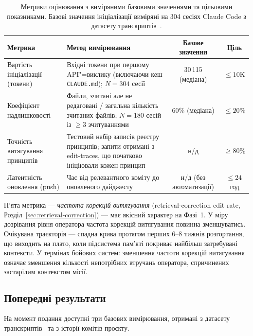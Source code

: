 \begin{table}[ht]
\centering
\small
\begin{tabularx}{\textwidth}{@{}l X c c@{}}
\toprule
\textbf{Метрика} & \textbf{Метод вимірювання} & \textbf{Базове значення} & \textbf{Ціль} \\
\midrule
Вартість ініціалізації (токени) &
  Вхідні токени при першому API"=виклику (включаючи кеш \texttt{CLAUDE.md}); $N{=}304$ сесії &
  30\,115 (медіана) & ${\leq}10$K \\
\addlinespace
Коефіцієнт надлишковості &
  Файли, зчитані але не редаговані / загальна кількість зчитаних файлів; $N{=}180$ сесій із ${\geq}3$ зчитуваннями &
  60\% (медіана) & ${\leq}20\%$ \\
\addlinespace
Точність витягування принципів &
  Тестовий набір записів реєстру принципів; запити отримані з edit-traces, що початково ініціювали кожен принцип &
  н/д & ${\geq}80\%$ \\
\addlinespace
Латентність оновлення (push) &
  Час від релевантного коміту до оновленого дайджесту &
  н/д (без автоматизації) & ${\leq}24$\,год \\
\bottomrule
\end{tabularx}
\caption{Метрики оцінювання з виміряними базовими значеннями та цільовими показниками.
  Базові значення ініціалізації виміряні на 304 сесіях Claude Code з датасету транскриптів~\citep{ovcharov2026edittrace}.}
\label{tab:metrics}
\end{table}

П'ята метрика --- \emph{частота корекцій витягування} (retrieval-correction edit rate, Розділ~\ref{sec:retrieval-correction}) --- має якісний характер на Фазі~1.
У міру дозрівання рівня оператора частота корекцій витягування повинна зменшуватись.
Очікувана траєкторія --- спадна крива протягом перших 6--8 тижнів розгортання, що виходить на плато, коли підсистема пам'яті покриває найбільш затребувані контексти.
У термінах бойових систем: зменшення частоти корекцій витягування означає зменшення кількості непотрібних втручань оператора, спричинених застарілим контекстом місії.


\subsection{Попередні результати}
\label{sec:preliminary}

На момент подання доступні три базових вимірювання, отримані з датасету транскриптів~\citep{ovcharov2026edittrace} та з історії комітів проєкту.

